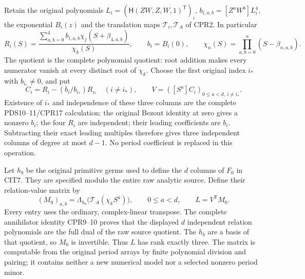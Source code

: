 \documentclass[11pt,a4paper]{article}
\begin{document}
Retain the original polynomials $L_i=(\mathsf H(ZW,Z,W,1)^{\mathsf T})_i$,
$b_{i,a,b}=[Z^aW^b]L_i^4$, the exponential $B_i(z)$ and the
translation maps $\mathcal T_i,\mathcal T_A$ of CPR2. In particular
\[
 R_i(S)=\frac{\sum_{a,b=0}^4b_{i,a,b}
                         \chi_j(S+\beta_{4,a,b})}{\chi_k(S)},
 \qquad b_i=B_i(0),\qquad
 \chi_n(S)=\prod_{a,b=0}^n(S-\beta_{n,a,b}).
 \tag{PRT4}
\]
The quotient is the complete polynomial quotient: root addition makes
every numerator vanish at every distinct root of $\chi_k$.
Choose the first original index $i_*$ with $b_{i_*}\ne0$, and put
\[
 C_i=R_i-(b_i/b_{i_*})R_{i_*}\quad(i\ne i_*),\qquad
 V=([S^a]C_i)_{0\le a<d,\ i\ne i_*}.
 \tag{PRT5}
\]
Existence of $i_*$ and independence of these three columns are the
complete PDS10--11/CPR17 calculation: the original Bezout identity at
zero gives a nonzero $b_i$; the four $R_i$ are independent; their leading
coefficients are $b_i$. Subtracting their exact leading multiples
therefore gives three independent columns of degree at most $d-1$.
No period coefficient is replaced in this operation.

Let $h_b$ be the original primitive germs used to define the $d$ columns
of $F_0$ in CIT7. They are specified modulo the entire raw analytic
source. Define their relation-value matrix by
\[
 (M_0)_{a,b}=\Lambda_{h_b}
                  \bigl(\mathcal T_A(\chi_k S^a)\bigr),
             \qquad0\le a<d,
 \qquad L=V^{\mathsf T}M_0.
 \tag{PRT6}
\]
Every entry uses the ordinary, complex-linear transpose. The complete
annihilator identity CPR9--10 proves that the displayed $d$ independent
relation polynomials are the full dual of the raw source quotient.
The $h_b$ are a basis of that quotient, so $M_0$ is invertible. Thus
$L$ has rank exactly three. The matrix is computable from the original
period arrays by finite polynomial division and pairing; it contains
neither a new numerical model nor a selected nonzero period minor.
\end{document}
